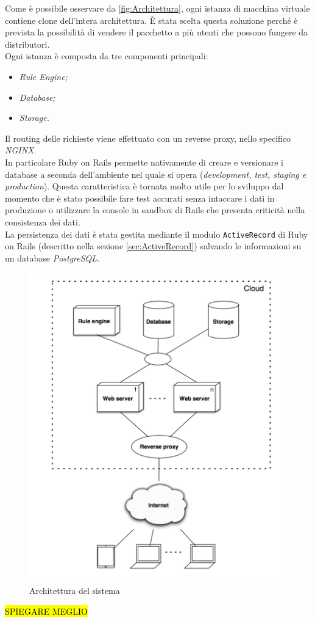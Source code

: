 Come è possibile osservare da \autoref{fig:Architettura}, ogni istanza di macchina virtuale contiene clone dell'intera architettura. È stata scelta questa soluzione perché è prevista la possibilità di vendere il pacchetto a più utenti che possono fungere da distributori.\\
Ogni istanza è composta da tre componenti principali:
\begin{itemize}
	\item \textit{Rule Engine;}
	\item \textit{Database;}
	\item \textit{Storage.}
\end{itemize}
Il routing delle richieste viene effettuato con un \gls{reverse proxy}, nello specifico \textit{NGINX}. \\
In particolare Ruby on Rails permette nativamente di creare e versionare i database a seconda dell'ambiente nel quale si opera (\textit{development, test, staging e production}). Questa caratteristica è tornata molto utile per lo sviluppo dal momento che è stato possibile fare test accurati senza intaccare i dati in produzione o utilizzare la console in sandbox di Rails che presenta criticità nella consistenza dei dati. \\
La persistenza dei dati è stata gestita mediante il modulo \texttt{ActiveRecord} di Ruby on Rails (descritto nella sezione \ref{sec:ActiveRecord}) salvando le informazioni su un database \textit{ PostgreSQL}.
\begin{figure}[H]
	\begin{center}
		\includegraphics[width=12cm]{Pics/architettura.png}
		\caption{Architettura del sistema}
		\label{fig:Architettura}
	\end{center}
\end{figure}
\hl{SPIEGARE MEGLIO}
